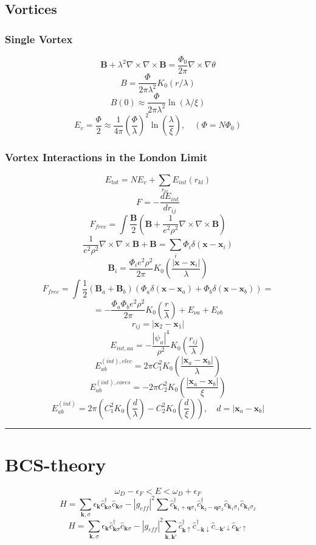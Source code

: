 \documentclass[12pt]{extarticle}
\newcommand{\parentheses}[1]{\ensuremath{\left( #1 \right)}}
\newcommand{\absolutevalue}[1]{\ensuremath{\left| #1 \right|}}
\newcommand{\creation}[1]{\hat{#1}^{\dagger}}
\newcommand{\mysection}[1]{
\vspace{1mm}
\hrule
\section{\Huge{#1}}}
\begin{document}
\begin{multicols*}{2}
\subsection{Vortices}

\subsubsection{Single Vortex}
$$\mathbf{B} + \lambda^2 \nabla \times \nabla \times \mathbf{B} = \dfrac{\Phi_0}{2\pi} \nabla \times \nabla \theta$$
$$B=\dfrac{\Phi}{2\pi \lambda^2}K_0(r/\lambda)$$
$$B(0) \approx \dfrac{\Phi}{2\pi \lambda^2}\ln(\lambda/\xi)$$
$$E_v=\dfrac{\Phi}{2} \approx\dfrac{1}{4\pi}\parentheses{\dfrac{\Phi}{\lambda}}^2 \ln \parentheses{\dfrac{\lambda}{\xi}}, \quad (\Phi=N\Phi_0)$$

\subsubsection{Vortex Interactions in the London Limit}
$$E_{tot} = NE_{v}+\sum_{r_{kl}} E_{int}(r_{kl})$$
$$F = -\dfrac{dE_{int}}{dr_{ij}}$$
$$F_{free}=\int \dfrac{\mathbf{B}}{2} \parentheses{\mathbf{B}+\dfrac{1}{e^2 \rho^2} \nabla \times \nabla \times \mathbf{B}}$$
$$\dfrac{1}{e^2 \rho^2} \nabla \times \nabla \times \mathbf{B} + \mathbf{B} = \sum_i \Phi_i \delta(\mathbf{x}-\mathbf{x}_i)$$
$$\mathbf{B}_i=\dfrac{\Phi_i e^2 \rho^2}{2\pi}K_0\parentheses{\dfrac{|\mathbf{x}-\mathbf{x}_i|}{\lambda}}$$
$$F_{free}=\int \dfrac{1}{2} \parentheses{\mathbf{B}_a+\mathbf{B}_b} \parentheses{\Phi_a \delta(\mathbf{x}-\mathbf{x}_a)+\Phi_b \delta(\mathbf{x}-\mathbf{x}_b)}=$$
$$=-\dfrac{\Phi_a \Phi_b e^2 \rho^2}{2 \pi}K_0 \parentheses{\dfrac{r}{\lambda}} + E_{\nu a}+ E_{\nu b}$$
$$r_{ij}=|\mathbf{x}_2-\mathbf{x}_1|$$
$$E_{int,aa}=-\dfrac{|\psi_a|^4}{\rho^2}K_0 \parentheses{\dfrac{r_{ij}}{\lambda}}$$
$$E^{(int),elec}_{ab}=2\pi C_1^2 K_0 \parentheses{\dfrac{\absolutevalue{\mathbf{x}_a-\mathbf{x}_b}}{\lambda}}$$
$$E^{(int),cores}_{ab}=-2\pi C_2^2 K_0 \parentheses{\dfrac{\absolutevalue{\mathbf{x}_a-\mathbf{x}_b}}{\xi}}$$
$$E^{(int)}_{ab}=2\pi \parentheses{C_1^2 K_0 \parentheses{\dfrac{d}{\lambda}}-C_2^2 K_0 \parentheses{\dfrac{d}{\xi}}}, \quad d=\absolutevalue{\mathbf{x}_a-\mathbf{x}_b}$$


\mysection{BCS-theory}
$$\omega_D - \epsilon_F < E < \omega_D + \epsilon_F$$
$$H=\sum_{\mathbf{k},\sigma} \epsilon_{\mathbf{k}} \creation{c}_{\mathbf{k}\sigma} \hat{c}_{\mathbf{k}\sigma} - \absolutevalue{g_{eff}}^2 \sum \creation{c}_{\mathbf{k}_1+\mathbf{q}\sigma_1} \creation{c}_{\mathbf{k}_2-\mathbf{q}\sigma_2}  \hat{c}_{\mathbf{k}_1\sigma_1} \hat{c}_{\mathbf{k}_2\sigma_2}$$
$$H=\sum_{\mathbf{k},\sigma} \epsilon_{\mathbf{k}} \creation{c}_{\mathbf{k}\sigma} \hat{c}_{\mathbf{k}\sigma} - \absolutevalue{g_{eff}}^2 \sum_{\mathbf{k,k'}} \creation{c}_{\mathbf{k}\uparrow} \creation{c}_{-\mathbf{k}\downarrow}  \hat{c}_{-\mathbf{k}'\downarrow} \hat{c}_{\mathbf{k}'\uparrow}$$



\end{multicols*}
\end{document}
